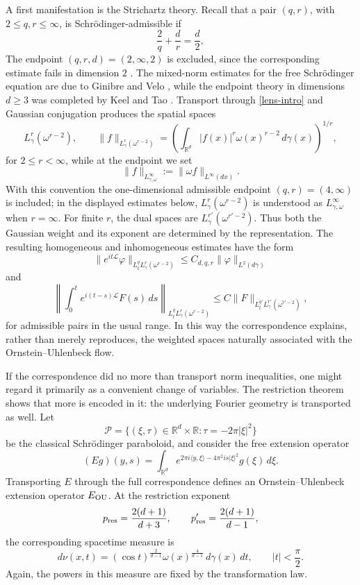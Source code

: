 \documentclass[11pt,a4paper]{amsart}
\def \R {\mathbb{R}}
\def \vf{\varphi}
\numberwithin{equation}{section}
\numberwithin{equation}{section}
\begin{document}
A first manifestation is the Strichartz theory.  Recall that a pair
$(q,r)$, with $2\le q,r\le\infty$, is Schr\"odinger-admissible if
\[
\frac2q+\frac dr=\frac d2,
\]
The endpoint $(q,r,d)=(2,\infty,2)$ is excluded, since the corresponding estimate fails in dimension $2$ \cite{MS98}.
The mixed-norm estimates for the free Schr\"odinger equation are due
to Ginibre and Velo \cite{GV}, while the endpoint theory in dimensions $d\geq3$ was completed by Keel and Tao \cite{KT}.  Transport through \eqref{lens-intro} and
Gaussian conjugation produces the spatial spaces
\[
L^r_\gamma(\omega^{r-2}),
\qquad
\|f\|_{L^r_\gamma(\omega^{r-2})}
=
\left(
\int_{\R^d}|f(x)|^r\omega(x)^{r-2}\,d\gamma(x)
\right)^{1/r},
\]
for $2\le r<\infty$, while at the endpoint we set
\[
\|f\|_{L^\infty_{\gamma,\omega}}:=\|\omega f\|_{L^\infty(dx)}.
\]
With this convention the one-dimensional admissible endpoint $(q,r)=(4,\infty)$ is included; in the displayed estimates below, $L^r_\gamma(\omega^{r-2})$ is understood as $L^\infty_{\gamma,\omega}$ when $r=\infty$.  For finite $r$, the dual spaces are
 $L^{r'}_\gamma(\omega^{r'-2})$.  Thus both the
Gaussian weight and its exponent are determined by the
representation.  The resulting homogeneous and inhomogeneous
estimates have the form
\begin{equation}\label{introStrHom}
\|e^{it\mathscr L}\vf\|_
{L^q_tL^r_\gamma(\omega^{r-2})}
\leq C_{d,q,r}\|\vf\|_{L^2(d\gamma)}
\end{equation}
and
\begin{equation}\label{introStrInhom}
\left\|
\int_0^t e^{i(t-s)\mathscr L}F(s)\,ds
\right\|_
{L^q_tL^r_\gamma(\omega^{r-2})}
\leq
C
\|F\|_
{L^{\widetilde q'}_t
 L^{\widetilde r'}_\gamma
 (\omega^{\widetilde r'-2})},
\end{equation}
for admissible pairs in the usual range.  In this way the
correspondence explains, rather than merely reproduces, the weighted
spaces naturally associated with the Ornstein--Uhlenbeck flow.

If the correspondence did no more than transport norm inequalities,
one might regard it primarily as a convenient change of variables.
The restriction theorem shows that more is encoded in it: the
underlying Fourier geometry is transported as well.  Let
\[
\mathcal P
=
\big\{(\xi,\tau)\in\R^d\times\R:
\tau=-2\pi|\xi|^2\big\}
\]
be the classical Schr\"odinger paraboloid, and consider the free
extension operator
\[
(Eg)(y,s)
=
\int_{\R^d}
e^{2\pi i\langle y,\xi\rangle-4\pi^2is|\xi|^2}
g(\xi)\,d\xi.
\]
Transporting $E$ through the full correspondence defines an
Ornstein--Uhlenbeck extension operator $E_{\rm OU}$.  At the
restriction exponent
\[
p_{\rm res}=\frac{2(d+1)}{d+3},
\qquad
p_{\rm res}'=\frac{2(d+1)}{d-1},
\]
the corresponding spacetime measure is
\begin{equation}\label{OUrestrictionmeasure-intro}
d\nu(x,t)
=
(\cos t)^{\frac{2}{d-1}}
\omega(x)^{\frac{4}{d-1}}\,
d\gamma(x)\,dt,
\qquad |t|<\frac{\pi}{2}.
\end{equation}
Again, the powers in this measure are fixed by the transformation
law.
\end{document}
